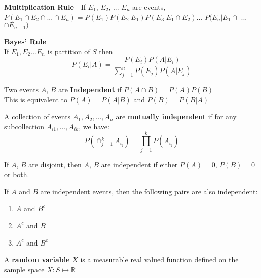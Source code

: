 \documentclass[14pt, oneside, letterpaper]{notes}
\begin{document}
\begin{mydef}
	\textbf{Multiplication Rule} - 
	If $E_1$, $E_2$, ... $E_n$ are events, \\ 
	$P(E_1 \cap E_2 \cap ... \cap E_n) = 
	P(E_1)P(E_2|E_1)P(E_3|E_1\cap E_2)$...
	$P(E_n|E_1 \cap$ ...$ \cap E_{n-1})$
\end{mydef}

%
%

\begin{mydef}
	\textbf{Bayes' Rule} \\
	If ${E_1, E_2 ... E_n}$ is partition of $S$ then \\
	\[ P(E_i|A) = \frac{P(E_i)P(A|E_i)}
	{\sum_{j=1}^{n}P(E_j)P(A|E_j)} \]
\end{mydef}

\begin{mydef}
	Two events $A$, $B$ are \textbf{Independent} if
	$P(A \cap B) = P(A)P(B)$ \\
	This is equivalent to $P(A) = P(A|B)$ and 
	$P(B) = P(B|A)$
\end{mydef}

\begin{mydef}
	A collection of events $A_1, A_2, ..., A_n$ are 
	\textbf{mutually independent} if for any subcollection
	$A_{i1}, ..., A_{ik}$, we have:
	\[ P(\cap_{j=1}^k A_{i_j}) = \prod_{j=1}^k P(A_{i_j}) \]
\end{mydef}

\begin{remark}
	If $A$, $B$ are disjoint, then $A$, $B$ are independent if
	either $P(A)=0$, $P(B)=0$ or both.
\end{remark}

\begin{remark}
	If $A$ and $B$ are independent events, then the 
	following pairs are also independent:
	\begin{enumerate}
		\item $A$ and $B^c$
		\item $A^c$ and $B$
		\item $A^c$ and $B^c$
	\end{enumerate}
\end{remark}


%
%

\begin{mydef}
	A \textbf{random variable} $X$ is a measurable real 
	valued function defined on the sample space 
	$X : S \mapsto \mathbb{R}$
\end{mydef}
\end{document}
